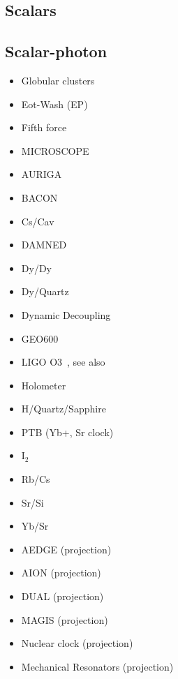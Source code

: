 \documentclass[8pt,twocolumn]{extarticle}
\begin{document}
\begin{mdframed}
\vspace{-1em}
\section{Scalars}\vspace{-0.5em}

\subsection*{Scalar-photon}\vspace{-0.5em}
\begin{itemize}\setlength\itemsep{-0.5em}
	\item Globular clusters~\cite{Dolan:2022kul}
	\item Eot-Wash (EP)~\cite{Hees:2018fpg}
	\item Fifth force~\cite{Adelberger:2003zx,Fischbach:1996eq,Fienga:2023ocw,Mars}
	\item MICROSCOPE~\cite{Berge:2017ovy}
	\item AURIGA~\cite{Branca:2016rez}
	\item BACON~\cite{BACON}
	\item Cs/Cav~\cite{Tretiak:2022ndx}
	\item DAMNED~\cite{Savalle:2020vgz}
	\item Dy/Dy~\cite{VanTilburg:2015oza}
	\item Dy/Quartz~\cite{Zhang:2022ewz}
	\item Dynamic Decoupling~\cite{Aharony:2019iad}
	\item GEO600~\cite{Vermeulen:2021epa}
	\item LIGO O3~\cite{Gottel:2024cfj}, see also~\cite{Fukusumi:2023kqd}
	\item Holometer~\cite{Aiello:2021wlp}
	\item H/Quartz/Sapphire~\cite{Campbell:2020fvq}
	\item PTB (Yb+, Sr clock)~\cite{Filzinger:2023zrs}
	\item I$_2$~\cite{Oswald:2021vtc}
	\item Rb/Cs~\cite{Hees:2016gop}
	\item Sr/Si~\cite{Kennedy:2020bac}
	\item Yb/Sr~\cite{Sherrill:2023zah}
	\item AEDGE (projection)~\cite{Badurina:2021rgt}
	\item AION (projection)~\cite{Badurina:2021rgt}
	\item DUAL (projection)~\cite{Arvanitaki:2015iga}
	\item MAGIS (projection)~\cite{MAGIS}
	\item Nuclear clock (projection)~\cite{Antypas:2022asj}
	\item Mechanical Resonators (projection)~\cite{Manley:2019vxy}
\end{itemize}
\vspace{-2em}


\end{mdframed}
\end{document}
